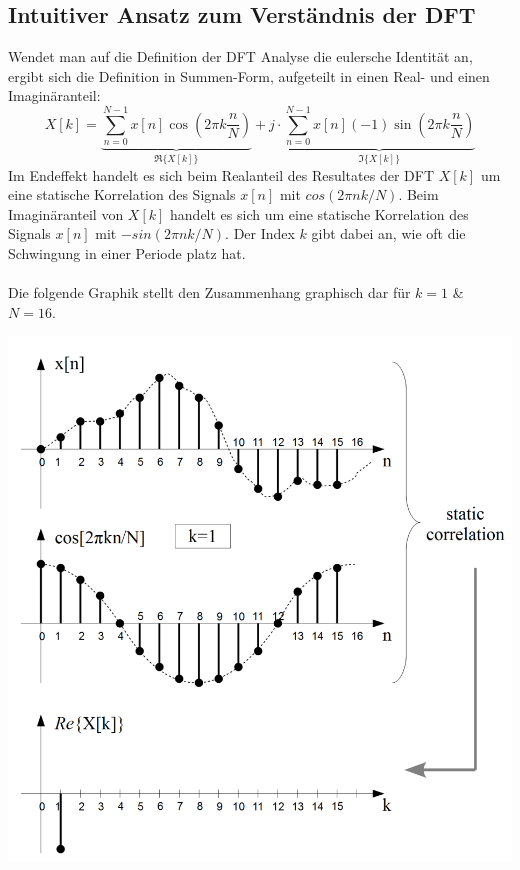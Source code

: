 \subsection{Intuitiver Ansatz zum Verständnis der DFT}
Wendet man auf die Definition der DFT Analyse die eulersche Identität an, 
ergibt sich die Definition in Summen-Form, aufgeteilt in einen Real- und einen 
Imaginäranteil:
\[ X[k]=\underbrace{\sum_{n=0}^{N-1}x[n]\cos(2\pi k\frac{n}{N})}_{\Re\{X[k]\}}
	+ j \cdot \underbrace{\sum_{n=0}^{N-1}x[n](-1)\sin(2\pi k \frac{n}{N})}_
	{\Im\{X[k]\}} \]
Im Endeffekt handelt es sich beim Realanteil des Resultates der DFT $X[k]$ um 
eine statische Korrelation des Signals $x[n]$ mit $cos(2\pi nk/N)$. 
Beim Imaginäranteil von $X[k]$ handelt es sich um eine statische Korrelation 
des Signals $x[n]$ mit $-sin(2\pi nk/N)$. Der Index $k$ gibt dabei an, wie oft die Schwingung in einer Periode platz hat.\\\\
Die folgende Graphik stellt den Zusammenhang graphisch dar für $k=1$ \& $N=16$.
\begin{center}
	\includegraphics[width=.475\textwidth]{../fig/dft_intuitiv}
\end{center}

